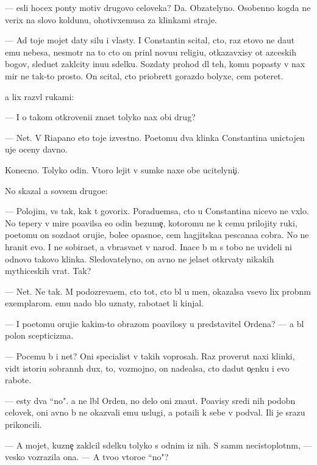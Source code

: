 \documentclass[10pt]{book}
\begin{document}
— {\Y}esli hocex pon{\ia}ty motiv{\yi} drugovo celoveka? Da. Ob{\ia}zatelyno. Osobenno kogda ne verix na slovo koldunu, ohotivxemusa za klinkami straje{\y}.

— Ad toje mojet daty silu i vlasty. I Constantin scital, cto, raz etovo ne da{\y}ut {\y}emu nebesa, nesmotr{\ia} na to cto on prin{\ia}l novu{\y}u religi{\y}u, otkazavxisy ot {\y}az{\yi}ceskih bogov, sledu{\y}et zakl{\io}city inu{\y}u sdelku. Sozdaty prohod dl{\ia} teh, komu popasty v nax mir ne tak-to prosto. On scital, cto priobret{\e}t gorazdo bolyxe, cem poter{\ia}{\y}et.

{\Y}a lix razv{\e}l rukami:

— I o takom otkroveni{\y}i zna{\y}et tolyko nax ob{\x}i{\y} drug?

— Net. V Riapano eto toje izvestno. Poetomu dva klinka Constantina unictojen{\yi} uje oceny davno.

Konecno. Tolyko odin. Vtoro{\y} lejit v sumke naxe{\y} ob{\x}e{\y} ucitelyni{\c}i.

No skazal {\y}a sovsem drugo{\y}e:

— Polojim, vs{\e} tak, kak t{\yi} govorix. Poradu{\y}emsa, cto u Constantina nicevo ne v{\yi}xlo. No tepery v mire po{\y}avilsa {\y}e{\x}o odin bezume{\c}, kotoromu ne k cemu prilojity ruki, poetomu on sozda{\y}ot oruji{\y}e, bole{\y}e opasno{\y}e, cem hagjitska{\y}a pescana{\y}a cobra. No ne hranit {\y}evo. I ne sobira{\y}et, a v{\yi}bras{\yi}va{\y}et v narod. Inace b{\yi} m{\yi} s tobo{\y} ne uvideli ni odnovo takovo klinka. Sledovatelyno, on {\y}avno ne jela{\y}et otkr{\yi}vaty nikakih mythiceskih vrat. Tak?

— Net. Ne tak. M{\yi} podozreva{\y}em, cto tot, cto b{\yi}l u men{\ia}, okazalsa vsevo lix probn{\yi}m exemplarom. {\Y}emu nado b{\yi}lo uznaty, rabota{\y}et li kinjal.

— I poetomu oruji{\y}e kakim-to obrazom po{\y}avilosy u predstavitel{\ia} Ordena? — {\Y}a b{\yi}l polon scepticizma.

— Pocemu b{\yi} i net? Oni specialist{\yi} v takih voprosah. Raz prover{\ia}{\y}ut naxi klinki, vid{\ia}t istori{\y}u sobrann{\yi}h dux, to, vozmojno, on nade{\y}alsa, cto dadut o{\c}enku i {\y}evo rabote.

— {\Y}esty dva ``no". {\Y}a ne l{\io}bl{\io} Orden, no delo oni zna{\y}ut. Po{\y}avisy sredi nih podobn{\yi}{\y} celovek, oni {\y}avno b{\yi} ne okaz{\yi}vali {\y}emu uslugi, a pota{\x}ili k sebe v podval{\yi}. Ili je srazu prikoncili.

— A mojet, kuzne{\c} zakl{\io}cil sdelku tolyko s odnim iz nih. S sam{\yi}m necistoplotn{\yi}m, — vesko vozrazila ona. — A tvo{\y}o vtoro{\y}e ``no"?
\end{document}
